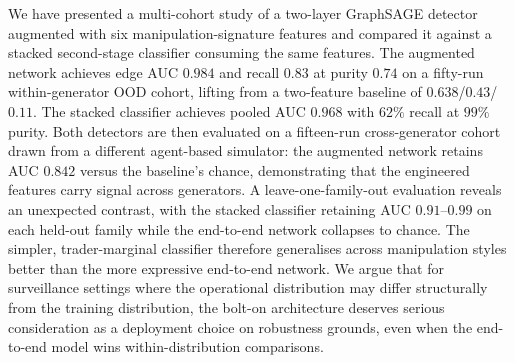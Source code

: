 \documentclass[10pt,twocolumn,letterpaper]{article}
\begin{document}
We have presented a multi-cohort study of a two-layer GraphSAGE
detector augmented with six manipulation-signature features and
compared it against a stacked second-stage classifier consuming the
same features. The augmented network achieves edge AUC \(0.984\) and
recall \(0.83\) at purity \(0.74\) on a fifty-run within-generator OOD
cohort, lifting from a two-feature baseline of \(0.638\)/\(0.43\)/\(0.11\).
The stacked classifier achieves pooled AUC \(0.968\) with \(62\%\)
recall at \(99\%\) purity. Both detectors are then evaluated on a
fifteen-run cross-generator cohort drawn from a different agent-based
simulator: the augmented network retains AUC \(0.842\) versus the
baseline's chance, demonstrating that the engineered features carry
signal across generators. A leave-one-family-out evaluation reveals an
unexpected contrast, with the stacked classifier retaining AUC
\(0.91\)--\(0.99\) on each held-out family while the end-to-end
network collapses to chance. The simpler, trader-marginal classifier
therefore generalises across manipulation styles better than the more
expressive end-to-end network. We argue that for surveillance settings
where the operational distribution may differ structurally from the
training distribution, the bolt-on architecture deserves serious
consideration as a deployment choice on robustness grounds, even when
the end-to-end model wins within-distribution comparisons.
\end{document}
